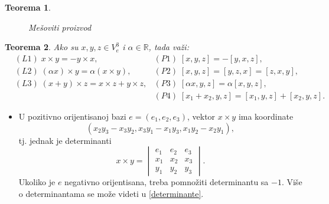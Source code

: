 \documentclass[a4paper,12pt,twoside]{report}
\newtheorem{theorem}{Teorema}[section]
\numberwithin{algorithm}{section}
\begin{document}
\begin{theorem}
\begin{figure}[!h]
    \caption{Mešoviti proizvod}
    \label{mesovitiProizvod1}
\end{figure}
\end{theorem}


\begin{theorem}
    Ako su $x, y, z \in V_e^3$ i $\alpha \in \mathbb{R}$, tada važi:
    \begin{align*}
        &(L1)\;x\times y = -y \times x, & (P1)\;[x, y, z] = - [y, x, z],\;\;\;\;\;\;\;\;\;\;\;\;\;\;\;\;\;\;\;\;\;\;\;\;\; \\
        &(L2)\;(\alpha x) \times y = \alpha (x \times y), & (P2)\; [x, y, z] = [y, z, x] = [z, x, y], \;\;\;\;\;\;\;\;\;\;\;\;\\
        &(L3)\; (x + y)\times z = x\times z + y \times z, & (P3)\;[\alpha x, y, z] = \alpha[x, y, z],\;\;\;\;\;\;\;\;\;\;\;\;\;\;\;\;\;\;\;\;\;\;\;\\
        &\; & (P4)\;[x_1 + x_2, y, z] = [x_1, y, z] + [x_2, y, z].
    \end{align*}
\end{theorem}
\begin{itemize}
    \item U pozitivno orijentisanoj bazi $e = (e_1, e_2, e_3)$, vektor $x \times y$ ima koordinate
    \[ (x_2y_3 - x_3y_2, x_3y_1 - x_1y_3, x_1y_2 - x_2y_1), \]
    tj. jednak je determinanti
    \[ x \times y = \begin{vmatrix}
        e_1 & e_2 & e_3 \\
        x_1 & x_2 & x_3 \\
        y_1 & y_2 & y_3
    \end{vmatrix}. \]
    Ukoliko je $e$ negativno orijentisana, treba pomnožiti determinantu sa $-1$. Više o determinantama se može videti u \ref{determinante}.
\end{itemize}
\vfill
\end{document}
